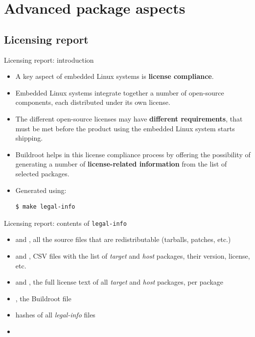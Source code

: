 
\section{Advanced package aspects}

\subsection{Licensing report}

\begin{frame}[fragile]{Licensing report: introduction}
  \begin{itemize}
  \item A key aspect of embedded Linux systems is {\bf license
      compliance}.
  \item Embedded Linux systems integrate together a number of
    open-source components, each distributed under its own license.
  \item The different open-source licenses may have {\bf different
      requirements}, that must be met before the product using the
    embedded Linux system starts shipping.
  \item Buildroot helps in this license compliance process by offering
    the possibility of generating a number of {\bf license-related
      information} from the list of selected packages.
  \item Generated using:
\begin{block}{}
\begin{verbatim}
$ make legal-info
\end{verbatim}
\end{block}
  \end{itemize}
\end{frame}

\begin{frame}{Licensing report: contents of {\tt legal-info}}
  \begin{itemize}
  \item {} and , all the source files
    that are redistributable (tarballs, patches, etc.)
  \item {} and , CSV files
    with the list of {\em target} and {\em host} packages, their
    version, license, etc.
  \item {} and , the full license text of all {\em
      target} and {\em host} packages, per package
  \item {}, the Buildroot  file
  \item {} hashes of all {\em legal-info} files
  \item {}
  \end{itemize}
\end{frame}

